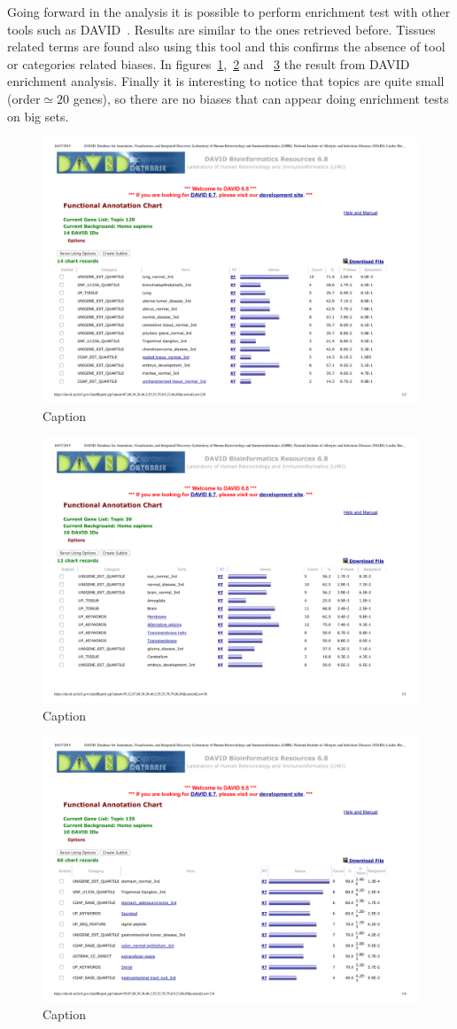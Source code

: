 Going forward in the analysis it is possible to perform enrichment test with other tools such as DAVID~\cite{huang2008bioinformatics,huang2009systematic}. Results are similar to the ones retrieved before. Tissues related terms are found also using this tool and this confirms the absence of tool or categories related biases. In figures~\ref{fig:topic/merged/DAVID_lung},~\ref{fig:topic/merged/DAVID_brain} and ~\ref{fig:topic/merged/DAVID_stomach} the result from DAVID enrichment analysis. Finally it is interesting to notice that topics are quite small (order$\simeq 20$ genes), so there are no biases that can appear doing enrichment tests on big sets.
\begin{figure}[htb!]
    \centering
    \includegraphics[width=0.6\linewidth]{pictures/topic/merged/DAVID_lung.pdf}
    \caption{Caption}
    \label{fig:topic/merged/DAVID_lung}
\end{figure}
\begin{figure}[htb!]
    \centering
    \includegraphics[width=0.6\linewidth]{pictures/topic/merged/DAVID_brain.pdf}
    \caption{Caption}
    \label{fig:topic/merged/DAVID_brain}
\end{figure}
\begin{figure}[htb!]
    \centering
    \includegraphics[width=0.6\linewidth]{pictures/topic/merged/DAVID_stomach.pdf}
    \caption{Caption}
    \label{fig:topic/merged/DAVID_stomach}
\end{figure}

